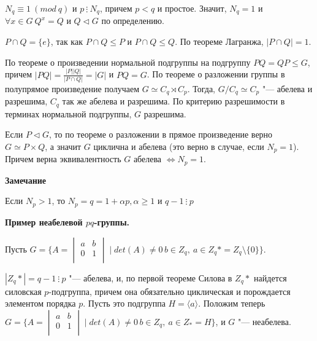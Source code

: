 \documentclass{article}
\begin{document}
$N_q \equiv 1 \  (mod \  q)$ и $p \ \vdots \ N_q$, причем $p < q$ и простое. Значит, $N_q = 1$ и $\forall x \in G \  Q^x = Q$ и $Q \triangleleft G$ по определению.

$P \cap Q = \{e\}$, так как $P \cap Q \leq P$ и $P \cap Q \leq Q$. По теореме Лагранжа, $|P \cap Q| = 1$.

По теореме о произведении нормальной подгруппы на подгруппу $PQ = QP \leq G$, причем $|PQ| = \frac{|P||Q|}{|P \cap Q|} = |G|$ и $PQ = G$. По теореме о разложении группы в полупрямое произведение получаем $G \simeq C_q \rtimes C_p$. Тогда, $G/C_q \simeq C_p$ "--- абелева и разрешима, $C_q$ так же абелева и разрешима. По критерию разрешимости в терминах нормальной подгруппы, $G$ разрешима.

\vspace{10pt}

Если $P \triangleleft G$, то по теореме о разложении в прямое произведение верно $G \simeq P \times Q$, а значит $G$ циклична и абелева (это верно в случае, если $N_p = 1$). Причем верна эквивалентность $G$ абелева $\Leftrightarrow N_p = 1$.

\vspace{10pt}

\textbf{Замечание}

Если $N_p > 1$, то $N_p = q = 1 + \alpha p, \alpha \geq 1$ и $q - 1 \ \vdots \ p$

\vspace{10pt}

\textbf{Пример неабелевой $pq$-группы.}

Пусть $G = \{ A = \begin{vmatrix}
	a & b \\
	0 & 1 \\
\end{vmatrix} \mid det(A) \neq 0\, b \in Z_q, \  a \in Z_q* = Z_q \setminus \{ 0 \}\}$.

$|Z_q*| = q-1 \ \vdots \ p$ "--- абелева, и, по первой теореме Силова в $Z_q*$ найдется силовская $p$-подгруппа, причем она обязательно циклическая и порождается элементом порядка $p$. Пусть это подгруппа $H = \langle a \rangle$. Положим теперь $G = \{ A = \begin{vmatrix}
	a & b \\
	0 & 1 \\
\end{vmatrix}
\mid det(A) \neq 0\, b \in Z_q, \  a \in Z_* = H\}$, и $G$ "--- неабелева.

\vspace{10pt}
\end{document}

